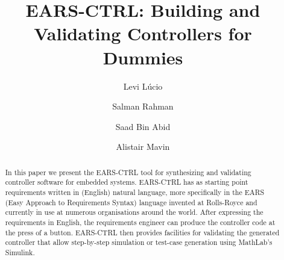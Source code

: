\documentclass{llncs}
\begin{document}
%
\frontmatter          %

\mainmatter              %
%
\title{EARS-CTRL: Building and Validating Controllers for Dummies}
%
\titlerunning{}  %
%
\author{Levi L\'ucio \and Salman Rahman
 \and Saad Bin Abid \and Alistair Mavin}
%
\authorrunning{} %
%
\tocauthor{}
%

\maketitle              %
\vspace{-.5cm}
\begin{abstract}
In this paper we present the EARS-CTRL tool for synthesizing and validating
controller software for embedded systems. EARS-CTRL has as starting point
requirements written in (English) natural language, more specifically in the
EARS (Easy Approach to Requirements Syntax) language invented at Rolls-Royce and
currently in use at numerous organisations around the world. After expressing
the requirements in English, the requirements engineer can produce the
controller code at the press of a button.
EARS-CTRL then provides facilities for validating the generated controller that
allow step-by-step simulation or test-case generation using MathLab's
Simulink.\vspace{-.4cm}
\end{abstract}

 








\vspace{-.4cm}
%

%
% 


\end{document}
